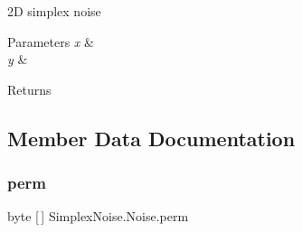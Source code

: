2D simplex noise 


\begin{DoxyParams}{Parameters}
{\em x} & \\
\hline
{\em y} & \\
\hline
\end{DoxyParams}
\begin{DoxyReturn}{Returns}

\end{DoxyReturn}


\subsection{Member Data Documentation}
\mbox{\label{class_simplex_noise_1_1_noise_ae8332871ecf7d21682b4a415edbbb5da}} 
\subsubsection{\texorpdfstring{perm}{perm}}
{\footnotesize\ttfamily byte \mbox{[}$\,$\mbox{]} Simplex\+Noise.\+Noise.\+perm\hspace{0.3cm}{\ttfamily [static]}}

